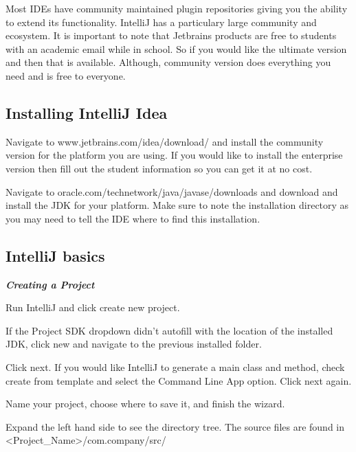 \documentclass[../../main.tex]{subfiles}
\begin{document}
Most IDEs have community maintained plugin repositories giving you the ability to extend its functionality.
IntelliJ has a particulary large community and ecosystem. It is important to note that Jetbrains products
are free to students with an academic email while in school. So if you would like the ultimate version and
then that is available. Although, community version does everything you need and is free to everyone.

\pagebreak

\subsection{Installing IntelliJ Idea}
\begin{steps}
   \item Navigate to www.jetbrains.com/idea/download/ and install the community version for the platform you are using. If you would like to
      install the enterprise version then fill out the student information so you can get it at no cost.
   \item Navigate to oracle.com/technetwork/java/javase/downloads and download and install the JDK for your platform. Make sure to note the
      installation directory as you may need to tell the IDE where to find this installation.
\end{steps}

\subsection{IntelliJ basics}
\emph{\bfseries Creating a Project}\\
\begin{steps}
   \item Run IntelliJ and click create new project.
   \item If the Project SDK dropdown didn't autofill with the location of the installed JDK, click new and navigate to the previous installed
      folder.
   \item Click next. If you would like IntelliJ to generate a main class and method, check create from template and select the Command Line App
      option. Click next again.
   \item Name your project, choose where to save it, and finish the wizard.
   \item Expand the left hand side to see the directory tree. The source files are found in <Project_Name>/com.company/src/
\end{steps}
\end{document}
